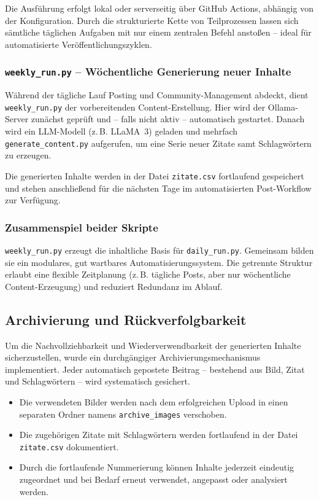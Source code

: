 \documentclass[a4paper,12pt]{article}
\begin{document}
Die Ausführung erfolgt lokal oder serverseitig über GitHub Actions, abhängig von der Konfiguration. Durch die strukturierte Kette von Teilprozessen lassen sich sämtliche täglichen Aufgaben mit nur einem zentralen Befehl anstoßen – ideal für automatisierte Veröffentlichungszyklen.

\subsubsection*{\texttt{weekly\_run.py} – Wöchentliche Generierung neuer Inhalte}

Während der tägliche Lauf Posting und Community-Management abdeckt, dient \texttt{weekly\_run.py} der vorbereitenden Content-Erstellung. Hier wird der Ollama-Server zunächst geprüft und – falls nicht aktiv – automatisch gestartet. Danach wird ein LLM-Modell (z.\,B. LLaMA~3) geladen und mehrfach \texttt{generate\_content.py} aufgerufen, um eine Serie neuer Zitate samt Schlagwörtern zu erzeugen.

Die generierten Inhalte werden in der Datei \texttt{zitate.csv} fortlaufend gespeichert und stehen anschließend für die nächsten Tage im automatisierten Post-Workflow zur Verfügung.
\clearpage
\subsubsection*{Zusammenspiel beider Skripte}

\texttt{weekly\_run.py} erzeugt die inhaltliche Basis für \texttt{daily\_run.py}. Gemeinsam bilden sie ein modulares, gut wartbares Automatisierungssystem. Die getrennte Struktur erlaubt eine flexible Zeitplanung (z.\,B. tägliche Posts, aber nur wöchentliche Content-Erzeugung) und reduziert Redundanz im Ablauf.
\subsection{Archivierung und Rückverfolgbarkeit}

Um die Nachvollziehbarkeit und Wiederverwendbarkeit der generierten Inhalte sicherzustellen, wurde ein durchgängiger Archivierungsmechanismus implementiert. Jeder automatisch gepostete Beitrag – bestehend aus Bild, Zitat und Schlagwörtern – wird systematisch gesichert.

\begin{itemize}
    \item Die verwendeten Bilder werden nach dem erfolgreichen Upload in einen separaten Ordner namens \texttt{archive\_images} verschoben.
    \item Die zugehörigen Zitate mit Schlagwörtern werden fortlaufend in der Datei \texttt{zitate.csv} dokumentiert.
    \item Durch die fortlaufende Nummerierung können Inhalte jederzeit eindeutig zugeordnet und bei Bedarf erneut verwendet, angepasst oder analysiert werden.
\end{itemize}
\end{document}
